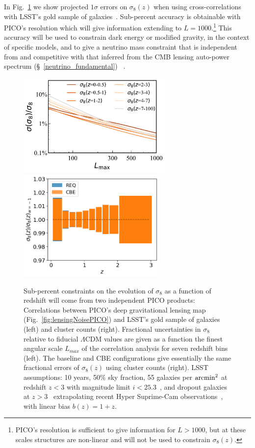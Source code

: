 \documentclass[PICOReport.tex]{subfiles}
\begin{document}
In Fig.~\ref{fig:sigma8} we show projected $1\sigma$ errors on $\sigma_8(z)$ when using cross-correlations with LSST's gold sample of galaxies~\citep{LSSTSciBook}.  Sub-percent accuracy is obtainable with PICO's resolution which will give information extending to $L =1000$.\footnote{PICO's resolution is sufficient to give information for $L>1000$, but at these scales structures are non-linear and will not be used to constrain $\sigma_{8}(z)$.} This accuracy will be used to constrain dark energy or modified gravity, in the context of specific models, and to give a neutrino mass constraint that is independent from and competitive with that inferred from the CMB lensing auto-power spectrum (\S~\ref{neutrino_fundamental})~\citep{2018arXiv180902120Y} .


\begin{figure}
\centering
\hspace{-0.15in}
\includegraphics[width=3in]{images/PICO_s8_lmax_PICOv4.1b_deproj0_SENS0_LSST10yrGold.pdf}
\hspace{-0.1in}
\includegraphics[width=2.9in,trim= 0cm 0.2cm 0cm 0cm]{images/PICOS8.png}
\caption{\captiontext  
Sub-percent constraints on the evolution of $\sigma_{8}$ as a function of redshift will come from two independent PICO products: Correlations between PICO's deep gravitational lensing map (Fig.~\ref{fig:lensingNoisePICO}) and LSST's gold sample of galaxies (left) and cluster counts (right). Fractional uncertainties in $\sigma_{8}$ relative to fiducial $\Lambda$CDM values are given as a function the finest angular scale $L_{max}$ of the correlation analysis for seven redshift bins (left).  The baseline and CBE configurations give essentially the same fractional errors of $\sigma_{8}(z)$ using cluster counts (right).  LSST assumptions: 10 years, 50\% sky fraction, 55 galaxies per ${\rm arcmin}^{2}$ at redshift $z<3$ with magnitude limit $i <25.3$~\citep{LSSTSciBook}, and dropout galaxies at $z>3$~\citep{dropouts} extrapolating recent Hyper Suprime-Cam observations~\cite{Schmittfull/Seljak,HSC1,HSC2}, with linear bias $b(z)=1+z$.
\label{fig:sigma8} }
\end{figure}
\end{document}

